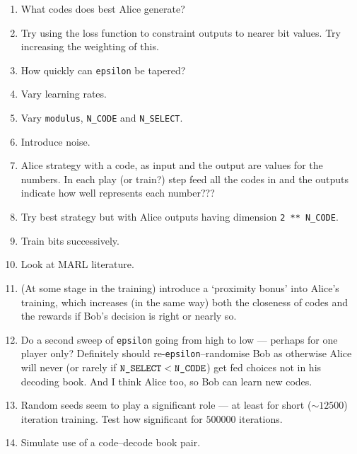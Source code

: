 \documentclass[12pt]{article}
\begin{document}
\begin{enumerate}
	\item What codes does best Alice generate?
	
	\item Try using the loss function to constraint outputs to nearer bit values.  Try increasing the weighting of this.
	
	\item How quickly can \verb|epsilon| be tapered? 
	
	\item Vary learning rates.
	
	\item Vary \verb|modulus|, \verb|N_CODE| and \verb|N_SELECT|.
	
	\item Introduce noise.
	
	\item Alice strategy with a code, as input and the output are values for the numbers.  In each play (or train?) step feed all the codes in and the outputs indicate how well represents each number???
	
	\item Try best strategy but with Alice outputs having dimension \verb|2 ** N_CODE|.
	
	\item Train bits successively. 
	
	\item Look at MARL literature.
	
	\item (At some stage in the training) introduce a `proximity bonus' into Alice's training, which increases (in the same way) both the closeness of codes and the rewards if Bob's decision is right or nearly so.
	
	\item Do a second sweep of \verb|epsilon| going from high to low --- perhaps for one player only?  Definitely should re-\verb|epsilon|--randomise Bob as otherwise Alice will never (or rarely if $\verb|N_SELECT| < \verb|N_CODE|$) get fed choices not in his decoding book.  And I think Alice too, so Bob can learn new codes.
	
	\item Random seeds seem to play a significant role --- at least for short ($\sim \num{12500}$) iteration training.  Test how significant for $\num{500000}$ iterations.
	
	\item Simulate use of a code--decode book pair.
	
\end{enumerate}







\end{document}
